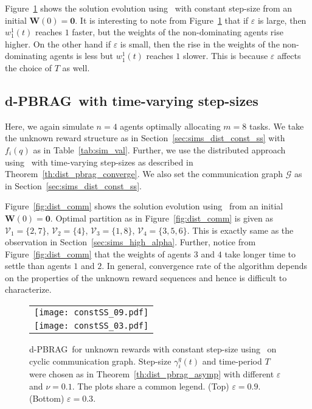 \documentclass{IEEEtran}
\newcommand{\Mcal}[1]{\mathcal{#1}}
\newcommand{\bld}[1]{\mathbf{#1}}
\newcommand{\marginn}[1]{\marginpar{\color{blue}\tiny\ttfamily#1}}
\newcommand{\margin}[1]{\marginpar{\color{magenta}\tiny\ttfamily#1}}
\def \alloc{\Mcal{V}}
\def \grph{\Mcal{G}}
\def \W{\bld{W}}
\def \zero{\bld{0}}
\def \dynacr{PBRAG}
\begin{document}
Figure~\ref{fig:dist_const_ss} shows the solution evolution
using~ with constant step-size from an initial
$\W(0) = \zero$. It is interesting to note from
Figure~\ref{fig:dist_const_ss} that if $\varepsilon$ is large, then
$w^1_1(t)$ reaches $1$ faster, but the weights of the non-dominating
agents rise higher. On the other hand if $\varepsilon$ is small, then
the rise in the weights of the non-dominating agents is less but
$w^1_1(t)$ reaches $1$ slower. This is because $\varepsilon$ affects
the choice of $T$ as well.

\subsection{d-\dynacr\, with time-varying
  step-sizes} \label{sec:sims_distributed} Here, we again simulate
$n = 4$ agents optimally allocating $m = 8$ tasks. We take the unknown
reward structure as in Section~\ref{sec:sims_dist_const_ss} with
$f_i(q)$ as in Table~\ref{tab:sim_val}. Further, we use the
distributed approach using~ with time-varying
step-sizes as described in Theorem~\ref{th:dist_pbrag_converge}. We
also set the communication graph $\grph$ as in
Section~\ref{sec:sims_dist_const_ss}.

Figure~\ref{fig:dist_comm} shows the solution evolution
using~ from an initial $\W(0) = \zero$. Optimal
partition as in Figure~\ref{fig:dist_comm} is given as
$\alloc_1 =\{2,7\}$, $\alloc_2 =\{4\}$, $\alloc_3 =\{1,8\}$,
$\alloc_4 =\{3,5,6\}$. This is exactly same as the observation in
Section~\ref{sec:sims_high_alpha}.  Further, notice from
Figure~\ref{fig:dist_comm} that the weights of agents $3$ and $4$ take
longer time to settle than agents $1$ and $2$. In general, convergence
rate of the algorithm depends on the properties of the unknown reward
sequences and hence is difficult to characterize.

\begin{figure}
\begin{center}
	\begin{tabular}{c}
		\hspace{-2ex}\texttt{[image: constSS\_09.pdf]} \\
		\hspace{-2ex}\texttt{[image: constSS\_03.pdf]}\\
	\end{tabular}
\end{center}
\caption{d-\dynacr\, for unknown rewards with constant step-size
  using~ on cyclic communication graph. Step-size
  $\gamma^q_i(t)$ and time-period $T$ were chosen as in
  Theorem~\ref{th:dist_pbrag_asymp} with different $\varepsilon$ and
  $\nu = 0.1$. The plots share a common legend. (Top)
  $\varepsilon = 0.9$. (Bottom) $\varepsilon = 0.3$.}
	\label{fig:dist_const_ss}
\end{figure}
\end{document}
